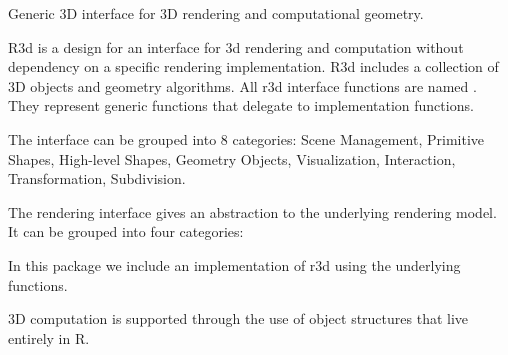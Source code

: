 \begin{Description}\relax
Generic 3D interface for 3D rendering and computational geometry.
\end{Description}
\begin{Details}\relax
R3d is a design for an interface for 3d rendering and computation without dependency
on a specific rendering implementation. R3d includes a collection
of 3D objects and geometry algorithms.
All r3d interface functions are named .  They represent generic functions that delegate 
to implementation functions.

The interface can be grouped into 8 categories: Scene Management, Primitive Shapes,
High-level Shapes, Geometry Objects, Visualization, Interaction, Transformation,
Subdivision.  

The rendering interface gives an abstraction to the underlying rendering model. It can
be grouped into four categories:    

In this package we include an implementation of r3d using the underlying  functions.

3D computation is supported through the use of object structures that live entirely in R.


\end{Details}
